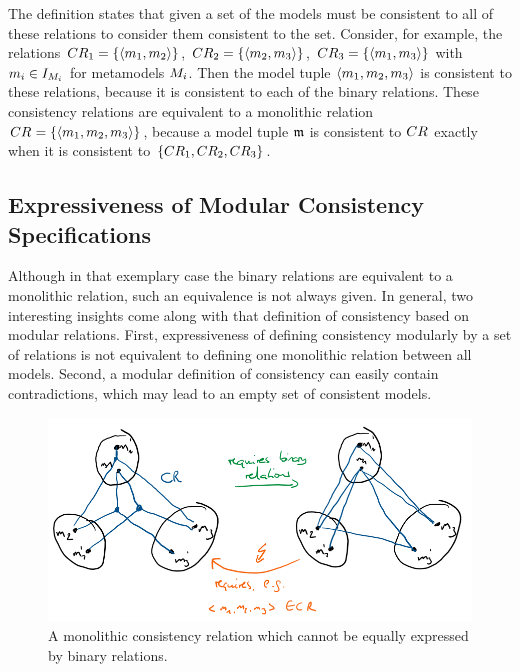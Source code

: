 The definition states that given a set of \modellevelconsistencyrelations the models must be consistent to all of these relations to consider them consistent to the set.
Consider, for example, the relations $CR_{1} = \{ \langle m_{1}, m_{2} \rangle \}$, $CR_{2} = \{ \langle m_{2},m_{3} \rangle \}$, $CR_{3} = \{ \langle m_{1}, m_{3} \rangle \}$ with $m_{i} \in I_{M_{i}}$ for metamodels $M_{i}$. Then the model tuple $\langle m_{1}, m_{2}, m_{3} \rangle$ is consistent to these relations, because it is consistent to each of the binary relations.
These consistency relations are equivalent to a monolithic relation $CR_{} = \{ \langle m_{1}, m_{2}, m_{3} \rangle \}$, because a model tuple $\mathfrak{m}$ is consistent to $CR_{}$ exactly when it is consistent to $\{ CR_{1}, CR_{2}, CR_{3} \}$.


\subsection{Expressiveness of Modular Consistency Specifications}

Although in that exemplary case the binary relations are equivalent to a monolithic relation, such an equivalence is not always given. In general, two interesting insights come along with that definition of consistency based on modular relations. First, expressiveness of defining consistency modularly by a set of relations is not equivalent to defining one monolithic relation between all models. Second, a modular definition of consistency can easily contain contradictions, which may lead to an empty set of consistent models.

\begin{figure}
    \centering
    \includegraphics[width=\textwidth]{figures/correctness/notion/binary_definable.png}
    \caption[Modular consistency relation that cannot be modularized]{A monolithic consistency relation which cannot be equally expressed by binary relations.}
    \label{fig:correctness:binary_definable}
\end{figure}

